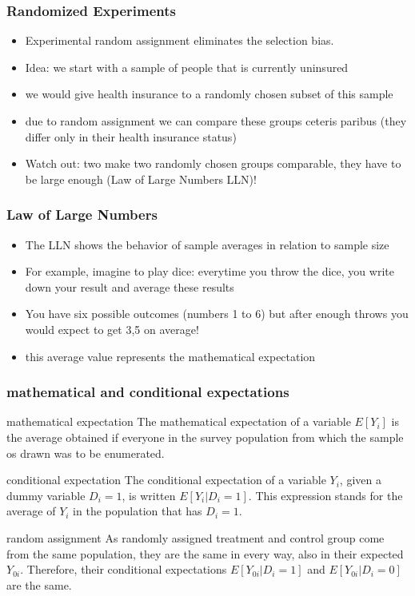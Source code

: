 \documentclass{beamer}
\begin{document}
\begin{frame}
\frametitle{Randomized Experiments}
\begin{itemize}
\item Experimental random assignment eliminates the selection bias.

\item Idea: we start with a sample of people that is currently uninsured
\item we would give health insurance to a randomly chosen subset of this sample
\item due to random assignment we can compare these groups ceteris paribus (they differ only in their health insurance status)
\item Watch out: two make two randomly chosen groups comparable, they have to be large enough (Law of Large Numbers LLN)!
\end{itemize}

\end{frame}

\begin{frame}
\frametitle{Law of Large Numbers}
\begin{itemize}
\item The LLN shows the behavior of sample averages in relation to sample size
\item For example, imagine to play dice: everytime you throw the dice, you write down your result and average these results
\item You have six possible outcomes (numbers 1 to 6) but after enough throws you would expect to get 3,5 on average!
\item this average value represents the mathematical expectation
\end{itemize}


\end{frame}

\begin{frame}
\frametitle{mathematical and conditional expectations}
\begin{block}{mathematical expectation}
The mathematical expectation of a variable $E[Y_i]$ is the average obtained if everyone in the survey population from which the sample os drawn was to be enumerated.
\end{block}

\begin{block}{conditional expectation}
The conditional expectation of a variable $Y_i$, given a dummy variable $D_i=1$, is written $E[Y_i|D_i=1]$. This expression stands for the average of $Y_i$ in the population that has $D_i =1$. 
\end{block}

\begin{block}{random assignment}
As randomly assigned treatment and control group come from the same population, they are the same in every way, also in their expected $Y_{0i}$. Therefore, their conditional expectations $E[Y_{0i}|D_i=1]$ and $E[Y_{0i}|D_i=0]$ are the same.
\end{block}


\end{frame}
\end{document}
